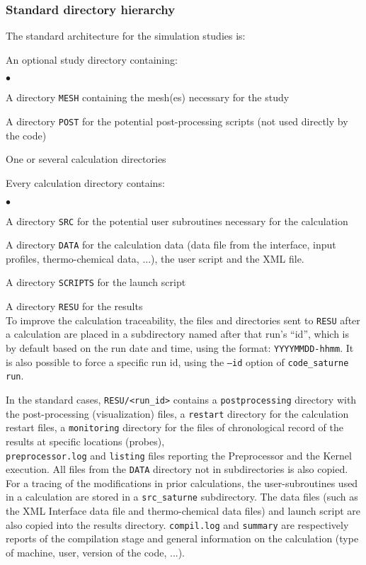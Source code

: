 \subsubsection{Standard directory hierarchy}
\label{sec:prg_architecture}%
The standard architecture for the simulation studies is:

\noindent
An optional study directory containing:
\begin{list}{$\bullet$}{}
\item A directory \texttt{MESH} containing the mesh(es)
      necessary for the study
\item A directory \texttt{POST} for the potential post-processing scripts (not
used directly by the code)
\item One or several calculation directories
\end{list}

\noindent
Every calculation directory contains:
\begin{list}{$\bullet$}{}
\item A directory \texttt{SRC} for the potential user subroutines
      necessary for the calculation
\item A directory \texttt{DATA} for the calculation data (data
      file from the interface, input profiles, thermo-chemical data, ...), the user script and the XML file.
\item A directory \texttt{SCRIPTS} for the launch script
\item A directory \texttt{RESU} for the results\\
To improve the calculation traceability, the files and directories
sent to \texttt{RESU} after a calculation are  placed in a subdirectory
named after that run's ``id'', which is by default based on the run date
and time, using the format: \texttt{YYYYMMDD-hhmm}.
It is also possible to force a specific run id, using the \texttt{--id}
option of \texttt{code\_saturne run}.
\end{list}

\noindent
In the standard cases, \texttt{RESU/<run\_id>} contains a
\texttt{postprocessing} directory with the post-processing
(visualization) files, a \texttt{restart} directory for the calculation
restart files, a \texttt{monitoring} directory for the files of chronological
record of the results at specific locations (probes),\\
\texttt{preprocessor.log} and \texttt{listing} files reporting the
Preprocessor and the Kernel execution. All files from the \texttt{DATA}
directory not in subdirectories is also copied. For a tracing of
the modifications in prior calculations, the user-subroutines used in
a calculation are stored in a \texttt{src\_saturne} subdirectory. The data files
(such as the XML Interface data file and thermo-chemical data files) and
launch script are also copied into the results directory. \texttt{compil.log} and
\texttt{summary} are respectively reports of the compilation stage and
general information on the calculation (type of machine, user,
version of the code, ...).

